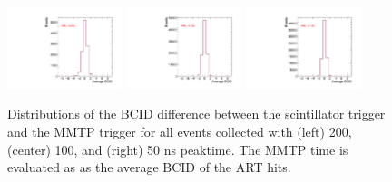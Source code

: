 \begin{figure}[!htpb]
  \begin{center}
    \includegraphics[width=0.3\textwidth]{figures/gbtanalysis3530/avg_BCID.pdf}
    \includegraphics[width=0.3\textwidth]{figures/gbtanalysis3527/avg_BCID.pdf}
    \includegraphics[width=0.3\textwidth]{figures/gbtanalysis3528/avg_BCID.pdf}
  \end{center}
  \vspace{-10pt}
  \caption{Distributions of the BCID difference between the scintillator trigger and the MMTP trigger
 for all events collected with (left) 200, (center) 100, and  (right) 50 ns peaktime.
 The MMTP  time is evaluated as as the average BCID of the ART hits.}
  \label{fig:integ_avg_bc}
\end{figure}
